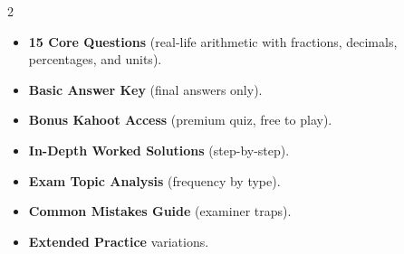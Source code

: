 \documentclass[11pt,a4paper]{article}
\newcommand{\FullReleaseDate}{April 30, 2026}
\begin{document}
\vspace{8pt}

\begin{multicols}{2}
  \begin{tcolorbox}[card, title=\sffamily\bfseries\textcolor{white}{\faHandPointDown\ TODAY (Simplified Version)}, colbacktitle=mainblue, boxed title style={sharp corners, boxrule=0pt}]
    \begin{itemize}[leftmargin=1.2em, itemsep=2pt]
      \item \small \textbf{15 Core Questions} (real-life arithmetic with fractions, decimals, percentages, and units).
      \item \small \textbf{Basic Answer Key} (final answers only).
      \item \small \textbf{Bonus Kahoot Access} (premium quiz, free to play).
    \end{itemize}
  \end{tcolorbox}

  \columnbreak

  \begin{tcolorbox}[card, title=\sffamily\bfseries\textcolor{white}{\faRocket\ ON \FullReleaseDate\ (Full Upgrade)}, colbacktitle=mainblue, boxed title style={sharp corners, boxrule=0pt}]
    \begin{itemize}[leftmargin=1.2em, itemsep=2pt]
      \item \small \textbf{In-Depth Worked Solutions} (step-by-step).
      \item \small \textbf{Exam Topic Analysis} (frequency by type).
      \item \small \textbf{Common Mistakes Guide} (examiner traps).
      \item \small \textbf{Extended Practice} variations.
    \end{itemize}
  \end{tcolorbox}
\end{multicols}
\end{document}
